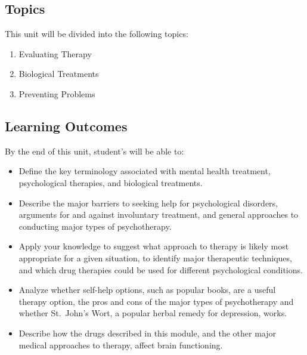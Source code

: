 \documentclass[
]{book}
\providecommand{\tightlist}{%
  \setlength{\itemsep}{0pt}\setlength{\parskip}{0pt}}
\begin{document}
\hypertarget{topics-11}{%
\subsection*{Topics}\label{topics-11}}

This unit will be divided into the following topics:

\begin{enumerate}
\def\labelenumi{\arabic{enumi}.}
\tightlist
\item
  Evaluating Therapy\\
\item
  Biological Treatments\\
\item
  Preventing Problems
\end{enumerate}

\hypertarget{learning-outcomes-11}{%
\subsection*{Learning Outcomes}\label{learning-outcomes-11}}

By the end of this unit, student's will be able to:

\begin{itemize}
\tightlist
\item
  Define the key terminology associated with mental health treatment, psychological therapies, and biological treatments.\\
\item
  Describe the major barriers to seeking help for psychological disorders, arguments for and against involuntary treatment, and general approaches to conducting major types of psychotherapy.\\
\item
  Apply your knowledge to suggest what approach to therapy is likely most appropriate for a given situation, to identify major therapeutic techniques, and which drug therapies could be used for different psychological conditions.\\
\item
  Analyze whether self-help options, such as popular books, are a useful therapy option, the pros and cons of the major types of psychotherapy and whether St.~John's Wort, a popular herbal remedy for depression, works.\\
\item
  Describe how the drugs described in this module, and the other major medical approaches to therapy, affect brain functioning.
\end{itemize}
\end{document}
